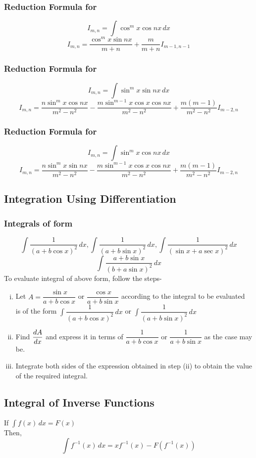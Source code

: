 \documentclass{article}
\begin{document}
\subsubsection{Reduction Formula for }
$$I_{m,n}=\displaystyle\int \cos^m x \cos nx  \, dx$$
$$I_{m,n}=\dfrac{\cos^m x \sin nx}{m+n}+\dfrac{m}{m+n}I_{m-1,n-1}$$
\subsubsection{Reduction Formula for }
$$I_{m,n}=\displaystyle\int \sin^m x \sin nx  \, dx$$
$$I_{m,n}=\dfrac{n\sin^m x \cos nx }{m^2 - n^2}- \dfrac{m\sin^{m-1}x \cos x \cos nx}{m^2-n^2}+\dfrac{m(m-1)}{m^2-n^2}I_{m-2,n}$$
\subsubsection{Reduction Formula for }
$$I_{m,n}=\displaystyle\int \sin^m x \cos nx  \, dx$$
$$I_{m,n}=\dfrac{n\sin^m x \sin nx}{m^2-n^2}- \dfrac{m \sin^{m-1}x \cos x \cos nx }{m^2-n^2}+\dfrac{m(m-1)}{m^2-n^2}I_{m-2,n}$$
\subsection{Integration Using Differentiation}
\subsubsection*{Integrals of form }
$$\displaystyle\int \dfrac{1}{(a+b\cos x)^2} \, dx, \displaystyle\int \dfrac{1}{(a+b\sin x)^2} \, dx, \displaystyle\int \dfrac{1}{(\sin x + a \sec x)^2} \, dx$$
$$\displaystyle\int \dfrac{a+b \sin x}{(b + a \sin x)^2} \, dx$$
To evaluate integral of above form, follow the steps-
\begin{enumerate}[i.]
    \item Let $A=\dfrac{\sin x}{a+b\cos x }$ or $\dfrac{\cos x }{a+b \sin x}$ according to the integral to be evaluated \\[2mm]
          is of the form $\displaystyle\int \dfrac{1}{(a+b \cos x)^2} \, dx$ or $\displaystyle\int \dfrac{1}{(a+b\sin x)^2} \, dx$
    \item Find $\displaystyle\dv{A}{x}$ and express it in terms of $\dfrac{1}{a+b\cos x}$ or $\dfrac{1}{a+b\sin x}$ as the case may be.
    \item Integrate both sides of the expression obtained in step (ii) to obtain the value of the required integral.
\end{enumerate}
\subsection{Integral of Inverse Functions}
If $\displaystyle\int f(x) \, dx=F(x)$
\\
Then, $$\displaystyle\int f^{-1} (x) \, dx=xf^{-1}(x)-F(f^{-1} (x))$$
\end{document}
